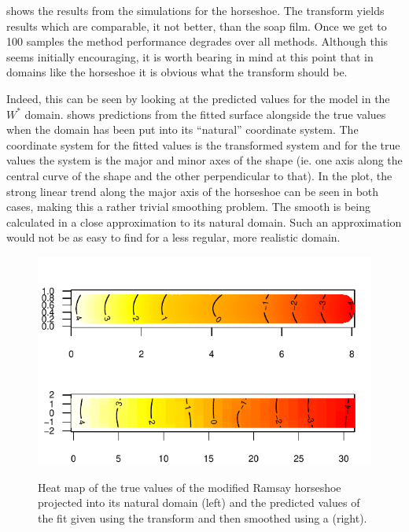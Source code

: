  shows the results from the simulations for the horseshoe. The \sch transform yields results which are comparable, it not better, than the soap film. Once we get to 100 samples the method performance degrades over all methods. Although this seems initially encouraging, it is worth bearing in mind at this point that in domains like the horseshoe it is obvious what the transform should be.

Indeed, this can be seen by looking at the predicted values for the model in the $W^*$ domain.  shows predictions from the fitted surface alongside the true values when the domain has been put into its ``natural'' coordinate system. The coordinate system for the fitted values is the \sch transformed system and for the true values the system is the major and minor axes of the shape (ie. one axis along the central curve of the shape and the other perpendicular to that). In the plot, the strong linear trend along the major axis of the horseshoe can be seen in both cases, making this a rather trivial smoothing problem. The smooth is being calculated in a close approximation to its natural domain. Such an approximation would not be as easy to find for a less regular, more realistic domain.

\begin{figure}
\centering
\includegraphics{sc/figs/hsvisgam.pdf} \\
\caption{Heat map of the true values of the modified Ramsay horseshoe projected into its natural domain (left) and the predicted values of the fit given using the \sch transform and then smoothed using a \tprs (right).}
\label{hsvisgam}
\end{figure}

